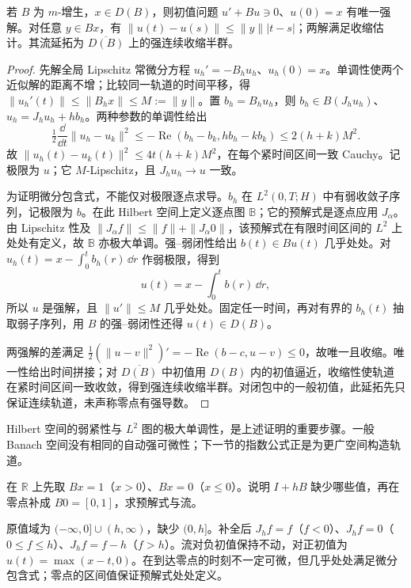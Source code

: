 \begin{theorem}\label{thm:y14-komura}
若 $B$ 为 $m$-增生，$x\in D(B)$，则初值问题 $u'+Bu\ni0$、$u(0)=x$ 有唯一强解。对任意 $y\in Bx$，有 $\|u(t)-u(s)\|\le\|y\||t-s|$；两解满足收缩估计。其流延拓为 $\overline{D(B)}$ 上的强连续收缩半群。
\end{theorem}
\begin{proof}
先解全局 Lipschitz 常微分方程 $u_h'=-B_hu_h$、$u_h(0)=x$。单调性使两个近似解的距离不增；比较同一轨道的时间平移，得 $\|u_h'(t)\|\le\|B_hx\|\le M:=\|y\|$。置 $b_h=B_hu_h$，则 $b_h\in B(J_hu_h)$、$u_h=J_hu_h+hb_h$。两种参数的单调性给出
\[
 \tfrac12\frac\dd{\dd t}\|u_h-u_k\|^2
 \le-\operatorname{Re}(b_h-b_k,hb_h-kb_k)
 \le2(h+k)M^2.
\]
故 $\|u_h(t)-u_k(t)\|^2\le4t(h+k)M^2$，在每个紧时间区间一致 Cauchy。记极限为 $u$；它 $M$-Lipschitz，且 $J_hu_h\to u$ 一致。

为证明微分包含式，不能仅对极限逐点求导。$b_h$ 在 $L^2(0,T;H)$ 中有弱收敛子序列，记极限为 $b$。在此 Hilbert 空间上定义逐点图 $\mathbb B$；它的预解式是逐点应用 $J_\alpha$。由 Lipschitz 性及 $\|J_\alpha f\|\le\|f\|+\|J_\alpha0\|$，该预解式在有限时间区间的 $L^2$ 上处处有定义，故 $\mathbb B$ 亦极大单调。强--弱闭性给出 $b(t)\in Bu(t)$ 几乎处处。对 $u_h(t)=x-\int_0^t b_h(r)\,\dd r$ 作弱极限，得到
\[
 u(t)=x-\int_0^t b(r)\,\dd r,
\]
所以 $u$ 是强解，且 $\|u'\|\le M$ 几乎处处。固定任一时间，再对有界的 $b_h(t)$ 抽取弱子序列，用 $B$ 的强--弱闭性还得 $u(t)\in D(B)$。

两强解的差满足 $\tfrac12(\|u-v\|^2)'=-\operatorname{Re}(b-c,u-v)\le0$，故唯一且收缩。唯一性给出时间拼接；对 $\overline{D(B)}$ 中初值用 $D(B)$ 内的初值逼近，收缩性使轨道在紧时间区间一致收敛，得到强连续收缩半群。对闭包中的一般初值，此延拓先只保证连续轨道，未声称零点有强导数。
\end{proof}

Hilbert 空间的弱紧性与 $L^2$ 图的极大单调性，是上述证明的重要步骤。一般 Banach 空间没有相同的自动强可微性；下一节的指数公式正是为更广空间构造轨道。

\begin{exercise}[到达障碍与多值补全]\label{ex:y14-obstacle}
在 $\mathbb R$ 上先取 $Bx=1$（$x>0$）、$Bx=0$（$x\le0$）。说明 $I+hB$ 缺少哪些值，再在零点补成 $B0=[0,1]$，求预解式与流。
\end{exercise}
\begin{solution}
原值域为 $(-\infty,0]\cup(h,\infty)$，缺少 $(0,h]$。补全后 $J_hf=f$（$f<0$）、$J_hf=0$（$0\le f\le h$）、$J_hf=f-h$（$f>h$）。流对负初值保持不动，对正初值为 $u(t)=\max(x-t,0)$。在到达零点的时刻不一定可微，但几乎处处满足微分包含式；零点的区间值保证预解式处处定义。
\end{solution}

